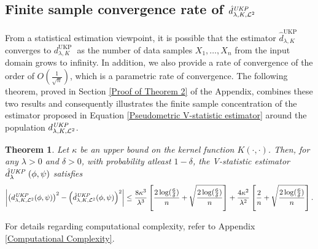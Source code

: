 \documentclass{article} %
\newcommand{\repone}{\phi}
\newcommand{\reptwo}{\psi}
\newcommand{\metricstname}{UKP }
\newcommand{\dtwo}{d_{\lambda,K,\mathcal{L}^{2}}^{\emph{\metricstname}}}
\newcommand{\dtwohat}{\hat{d}_{\lambda,K,\mathcal{L}^{2}}^{\emph{\metricstname}}}
\theoremstyle{plain}
\newcounter{theoremno}
\newtheorem{theorem}[theoremno]{Theorem}
\begin{document}
\subsection{Finite sample convergence rate of $\dtwohat$} \label{Finite sample convergence rate}

From a statistical estimation viewpoint, it is possible that the estimator $\hat{d}_{\lambda,K}^{\text{\metricstname}}$ converges to $d_{\lambda,K}^{\text{\metricstname}}$ as the number of data samples $X_{1},\dots,X_{n}$ from the input domain grows to infinity. In addition, we also provide a rate of convergence of the order of $O(\frac{1}{\sqrt{n}})$, which is a parametric rate of convergence. The following theorem, proved in Section \ref{Proof of Theorem 2} of the Appendix, combines these two results and consequently illustrates the finite sample concentration of the  estimator proposed in Equation \eqref{Pseudometric V-statistic estimator} around the population $\dtwo$.

\begin{theorem} \label{Theorem: Finite sample convergence}
    Let $\kappa$ be an upper bound on the kernel function $K(\cdot,\cdot)$. Then, for any $\lambda>0$ and $\delta>0$, with probability atleast $1-\delta$, the V-statistic estimator $\hat{d}_{\lambda}^{\emph{\metricstname}}(\repone,\reptwo)$ satisfies
    \[
    \begin{aligned}
    \left|\left(\dtwo(\repone,\reptwo)\right)^{2}-\left(\dtwohat(\repone,\reptwo)\right)^{2}\right|\leq \frac{8\kappa^{3}}{\lambda^{3}}\left[\frac{2\log(\frac{6}{\delta})}{n} + \sqrt{\frac{2\log(\frac{6}{\delta})}{n}}\right]+ \frac{4\kappa^{2}}{\lambda^{2}}\left[\frac{2}{n} + \sqrt{\frac{2\log(\frac{6}{\delta})}{n}}\right] .
    \end{aligned}
    \]
\end{theorem}
For details regarding computational complexity, refer to Appendix \ref{Computational Complexity}.

\end{document}
